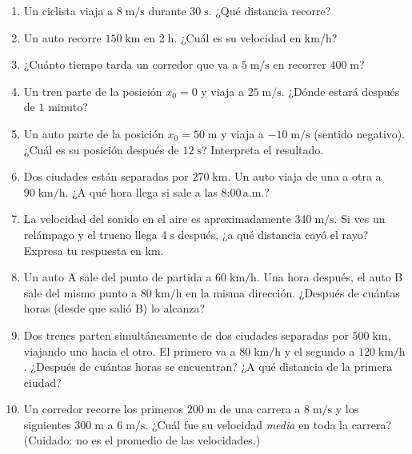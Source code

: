 \documentclass[12pt, a4paper]{article}
\begin{document}
\begin{enumerate}[leftmargin=*, resume]
  \item \facil{} Un ciclista viaja a $8\;\text{m/s}$ durante $30\;\text{s}$. ¿Qué distancia recorre?

  \item \facil{} Un auto recorre $150\;\text{km}$ en $2\;\text{h}$. ¿Cuál es su velocidad en km/h?

  \item \facil{} ¿Cuánto tiempo tarda un corredor que va a $5\;\text{m/s}$ en recorrer $400\;\text{m}$?

  \item \facil{} Un tren parte de la posición $x_0 = 0$ y viaja a $25\;\text{m/s}$. ¿Dónde estará después de $1$ minuto?

  \item \medio{} Un auto parte de la posición $x_0 = 50\;\text{m}$ y viaja a $-10\;\text{m/s}$ (sentido negativo). ¿Cuál es su posición después de $12\;\text{s}$? Interpreta el resultado.

  \item \medio{} Dos ciudades están separadas por $270\;\text{km}$. Un auto viaja de una a otra a $90\;\text{km/h}$. ¿A qué hora llega si sale a las 8:00\,a.m.?

  \item \medio{} La velocidad del sonido en el aire es aproximadamente $340\;\text{m/s}$. Si ves un relámpago y el trueno llega $4\;\text{s}$ después, ¿a qué distancia cayó el rayo? Expresa tu respuesta en km.

  \item \medio{} Un auto A sale del punto de partida a $60\;\text{km/h}$. Una hora después, el auto B sale del mismo punto a $80\;\text{km/h}$ en la misma dirección. ¿Después de cuántas horas (desde que salió B) lo alcanza?

  \item \dificil{} Dos trenes parten simultáneamente de dos ciudades separadas por $500\;\text{km}$, viajando uno hacia el otro. El primero va a $80\;\text{km/h}$ y el segundo a $120\;\text{km/h}$. ¿Después de cuántas horas se encuentran? ¿A qué distancia de la primera ciudad?

  \item \dificil{} Un corredor recorre los primeros $200\;\text{m}$ de una carrera a $8\;\text{m/s}$ y los siguientes $300\;\text{m}$ a $6\;\text{m/s}$. ¿Cuál fue su velocidad \emph{media} en toda la carrera? (Cuidado: no es el promedio de las velocidades.)


\end{enumerate}
\end{document}

